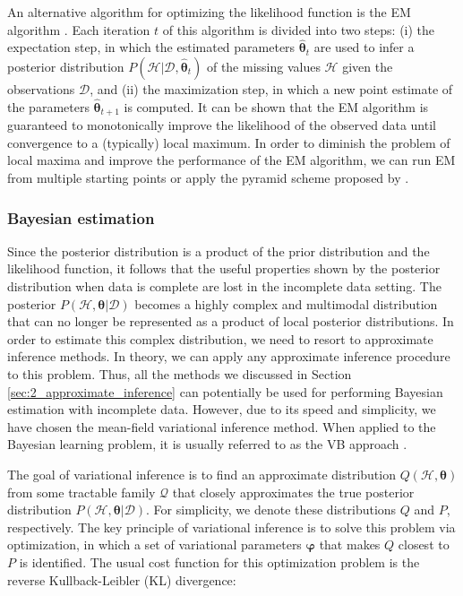An alternative algorithm for optimizing the likelihood function is the EM algorithm \citep{dempster1977, mclachlan2008}. Each iteration $t$ of this algorithm is divided into two steps: (i) the expectation step, in which the estimated parameters $\hat{\bm{\theta}}_{t}$ are used to infer a posterior distribution $P(\mathcal{H} | \mathcal{D}, \hat{\bm{\theta}}_{t})$ of the missing values $\mathcal{H}$ given the observations $\mathcal{D}$, and (ii) the maximization step, in which a new point estimate of the parameters $\hat{\bm{\theta}}_{t+1}$ is computed. It can be shown that the EM algorithm is guaranteed to monotonically improve the likelihood of the observed data until convergence to a (typically) local maximum. In order to diminish the problem of local maxima and improve the performance of the EM algorithm, we can run EM from multiple starting points or apply the pyramid scheme proposed by \cite{chickering1997}.

\subsubsection*{Bayesian estimation}

Since the posterior distribution is a product of the prior distribution and the likelihood function, it follows that the useful properties shown by the posterior distribution when data is complete are lost in the incomplete data setting. The posterior $P(\mathcal{H}, \bm{\theta} | \mathcal{D})$ becomes a highly complex and multimodal distribution that can no longer be represented as a product of local posterior distributions. In order to estimate this complex distribution, we need to resort to approximate inference methods. In theory, we can apply any approximate inference procedure to this problem. Thus, all the methods we discussed in Section \ref{sec:2_approximate_inference} can potentially be used for performing Bayesian estimation with incomplete data. However, due to its speed and simplicity, we have chosen the mean-field variational inference method. When applied to the Bayesian learning problem, it is usually referred to as the VB approach \citep{attias2000}.

The goal of variational inference is to find an approximate distribution $Q(\mathcal{H}, \bm{\theta})$ from some tractable family $\mathcal{Q}$ that closely approximates the true posterior distribution $P(\mathcal{H}, \bm{\theta} | \mathcal{D})$. For simplicity, we denote these distributions $Q$ and $P$, respectively. The key principle of variational inference is to solve this problem via optimization, in which a set of variational parameters $\bm{\varphi}$ that makes $Q$ closest to $P$ is identified. The usual cost function for this optimization problem is the reverse Kullback-Leibler (KL) divergence:

